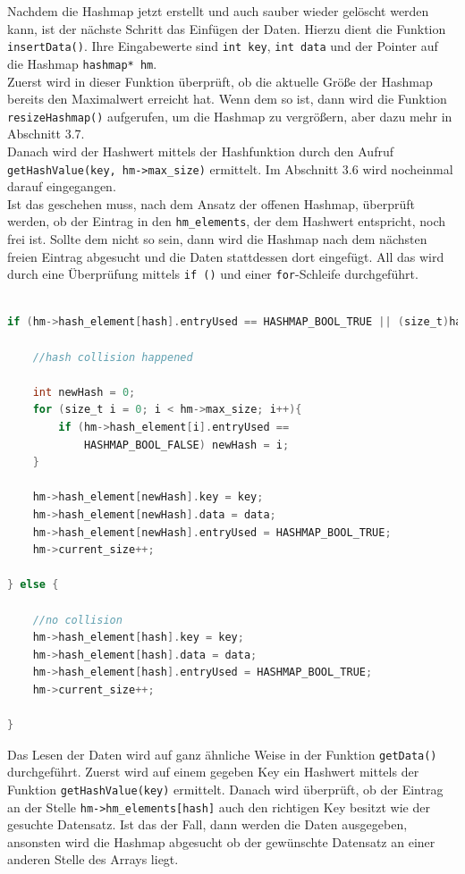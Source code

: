 \documentclass[11pt,a4paper]{article}
\begin{document}
Nachdem die Hashmap jetzt erstellt und auch sauber wieder gelöscht werden kann, ist der nächste Schritt das Einfügen der Daten.
Hierzu dient die Funktion \lstinline{insertData()}. Ihre Eingabewerte sind \lstinline{int key}, \lstinline{int data} und der Pointer auf die Hashmap 
\lstinline{hashmap* hm}.\\
Zuerst wird in dieser Funktion überprüft, ob die aktuelle Größe der Hashmap bereits den Maximalwert erreicht hat. Wenn dem so ist, dann wird die Funktion 
\lstinline{resizeHashmap()} aufgerufen, um die Hashmap zu vergrößern, aber dazu mehr in Abschnitt 3.7.\\
Danach wird der Hashwert mittels der Hashfunktion durch den Aufruf \\
\lstinline{getHashValue(key, hm->max_size)} ermittelt. Im Abschnitt 3.6 wird nocheinmal darauf eingegangen.\\
Ist das geschehen muss, nach dem Ansatz der offenen Hashmap, überprüft werden, ob der Eintrag in den \lstinline{hm_elements}, der dem Hashwert entspricht, 
noch frei ist. Sollte dem nicht so sein, dann wird die Hashmap nach dem nächsten freien Eintrag abgesucht und die Daten stattdessen dort eingefügt. 
All das wird durch eine Überprüfung mittels \lstinline{if ()} und einer \lstinline{for}-Schleife durchgeführt.\\

\begin{lstlisting}[language=C]

if (hm->hash_element[hash].entryUsed == HASHMAP_BOOL_TRUE || (size_t)hash > hm->max_size){

    //hash collision happened

    int newHash = 0;
    for (size_t i = 0; i < hm->max_size; i++){
        if (hm->hash_element[i].entryUsed == 
            HASHMAP_BOOL_FALSE) newHash = i;
    }

    hm->hash_element[newHash].key = key;
    hm->hash_element[newHash].data = data;
    hm->hash_element[newHash].entryUsed = HASHMAP_BOOL_TRUE;
    hm->current_size++;

} else {

    //no collision
    hm->hash_element[hash].key = key;
    hm->hash_element[hash].data = data;
    hm->hash_element[hash].entryUsed = HASHMAP_BOOL_TRUE;
    hm->current_size++;

}

\end{lstlisting}

Das Lesen der Daten wird auf ganz ähnliche Weise in der Funktion \lstinline{getData()} durchgeführt.
Zuerst wird auf einem gegeben Key ein Hashwert mittels der Funktion \lstinline{getHashValue(key)} ermittelt. Danach wird überprüft, ob der Eintrag an der Stelle \lstinline{hm->hm_elements[hash]} auch 
den richtigen Key besitzt wie der gesuchte Datensatz. Ist das der Fall, dann werden die Daten ausgegeben, ansonsten wird die Hashmap 
abgesucht ob der gewünschte Datensatz an einer anderen Stelle des Arrays liegt.\\
\end{document}
